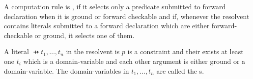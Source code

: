 \begin{defi}
A computation rule is , if it selects only a predicate submitted to forward declaration when it is ground or forward checkable and if, whenever the resolvent contains literals submitted to a forward declaration which are either forward-checkable or ground, it selects one of them.
\cite{conf/ijcai/Hentenryck87}
\end{defi}

\begin{defi}
A literal $\pfun{t_1,\ldots,t_n}$ in the resolvent is  \iffTx{} $p$ is a constraint and their exists at least one $t_i$ which is a domain-variable and each other argument is either ground or a domain-variable. The domain-variables in $t_1,\ldots,t_n$ are called the s.
\cite{conf/ijcai/Hentenryck87}
\end{defi}

